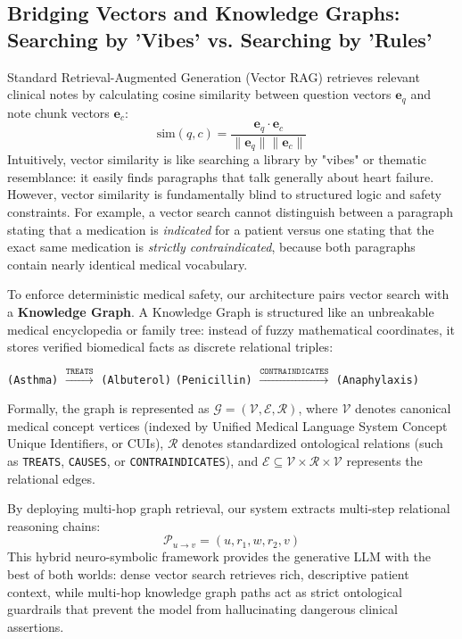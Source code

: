 \documentclass[11pt, a4paper]{article}
\begin{document}
\subsection{Bridging Vectors and Knowledge Graphs: Searching by 'Vibes' vs. Searching by 'Rules'}
Standard Retrieval-Augmented Generation (Vector RAG) retrieves relevant clinical notes by calculating cosine similarity between question vectors $\mathbf{e}_q$ and note chunk vectors $\mathbf{e}_c$:
\begin{equation}
  \text{sim}(q, c) = \frac{\mathbf{e}_q \cdot \mathbf{e}_c}{\|\mathbf{e}_q\| \|\mathbf{e}_c\|}
\end{equation}
Intuitively, vector similarity is like searching a library by "vibes" or thematic resemblance: it easily finds paragraphs that talk generally about heart failure. However, vector similarity is fundamentally blind to structured logic and safety constraints. For example, a vector search cannot distinguish between a paragraph stating that a medication is \textit{indicated} for a patient versus one stating that the exact same medication is \textit{strictly contraindicated}, because both paragraphs contain nearly identical medical vocabulary.

To enforce deterministic medical safety, our architecture pairs vector search with a \textbf{Knowledge Graph}. A Knowledge Graph is structured like an unbreakable medical encyclopedia or family tree: instead of fuzzy mathematical coordinates, it stores verified biomedical facts as discrete relational triples:
\begin{center}
  \texttt{(Asthma)} $\xrightarrow{\texttt{TREATS}}$ \texttt{(Albuterol)} \quad {} \quad \texttt{(Penicillin)} $\xrightarrow{\texttt{CONTRAINDICATES}}$ \texttt{(Anaphylaxis)}
\end{center}
Formally, the graph is represented as $\mathcal{G} = (\mathcal{V}, \mathcal{E}, \mathcal{R})$, where $\mathcal{V}$ denotes canonical medical concept vertices (indexed by Unified Medical Language System Concept Unique Identifiers, or CUIs), $\mathcal{R}$ denotes standardized ontological relations (such as \texttt{TREATS}, \texttt{CAUSES}, or \texttt{CONTRAINDICATES}), and $\mathcal{E} \subseteq \mathcal{V} \times \mathcal{R} \times \mathcal{V}$ represents the relational edges.

By deploying multi-hop graph retrieval, our system extracts multi-step relational reasoning chains:
\begin{equation}
  \mathcal{P}_{u \to v} = (u, r_1, w, r_2, v)
\end{equation}
This hybrid neuro-symbolic framework provides the generative LLM with the best of both worlds: dense vector search retrieves rich, descriptive patient context, while multi-hop knowledge graph paths act as strict ontological guardrails that prevent the model from hallucinating dangerous clinical assertions.
\end{document}
